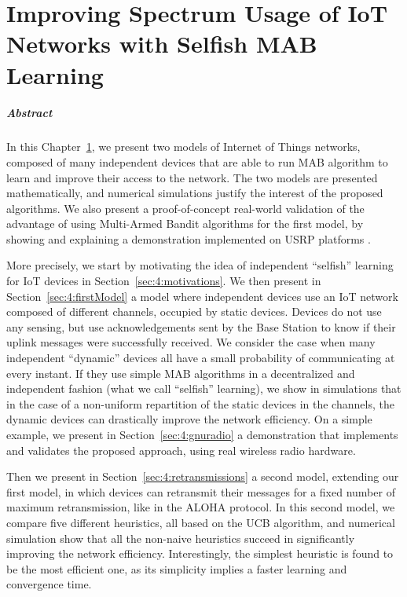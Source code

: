 
\chapter{Improving Spectrum Usage of IoT Networks with Selfish MAB Learning}
\label{chapter:4}
\minitoc

\newpage
\paragraph{Abstract}

In this Chapter~\ref{chapter:4}, we present two models of Internet of Things networks, composed of many independent devices that are able to run MAB algorithm to learn and improve their access to the network.
The two models are presented mathematically, and numerical simulations justify the interest of the proposed algorithms.
We also present a proof-of-concept real-world validation of the advantage of using Multi-Armed Bandit algorithms for the first model, by showing and explaining a demonstration implemented on USRP platforms \cite{USRPDocumentation}.

More precisely, we start by motivating the idea of independent ``selfish'' learning for IoT devices in Section~\ref{sec:4:motivations}.
We then present in Section~\ref{sec:4:firstModel} a model where independent devices use an IoT network composed of different channels, occupied by static devices.
Devices do not use any sensing, but use acknowledgements sent by the Base Station to know if their uplink messages were successfully received.
We consider the case when many independent ``dynamic'' devices all have a small probability of communicating at every instant. If they use simple MAB algorithms in a decentralized and independent fashion (what we call ``selfish'' learning),
we show in simulations that in the case of a non-uniform repartition of the static devices in the channels, the dynamic devices can drastically improve the network efficiency.
%
On a simple example, we present in Section~\ref{sec:4:gnuradio} a demonstration that implements and validates the proposed approach, using real wireless radio hardware.

Then we present in Section~\ref{sec:4:retransmissions} a second model, extending our first model, in which devices can retransmit their messages for a fixed number of maximum retransmission, like in the ALOHA protocol.
In this second model, we compare five different heuristics, all based on the UCB algorithm, and numerical simulation show that all the non-naive heuristics succeed in significantly improving the network efficiency.
Interestingly, the simplest heuristic is found to be the most efficient one, as its simplicity implies a faster learning and convergence time.

